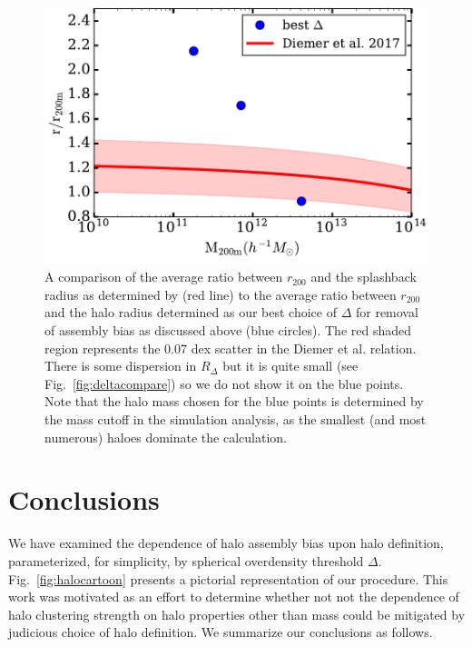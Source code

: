 \documentclass[usenatbib,fleqn]{mnras}
\begin{document}
\begin{figure}
	\centering
	\includegraphics[width=\columnwidth]{test_splashback.pdf}
	\caption{A comparison of the average ratio between $r_{200}$ and the splashback radius as determined by \citet{diemer_etal17} (red line) to the average ratio between $r_{200}$ and the halo radius determined as our best choice of $\Delta$ for removal of assembly bias as discussed above (blue circles). The red shaded region represents the 0.07 dex scatter in the Diemer et al. relation. There is some dispersion in $R_{\Delta}$ but it is quite small (see Fig.~\ref{fig:deltacompare}) so we do not show it on the blue points. Note that the halo mass chosen for the blue points is determined by the mass cutoff in the simulation analysis, as the smallest (and most numerous) haloes dominate the calculation.
}
	\label{fig:splashback_compare}
\end{figure}

\section[]{Conclusions}
\label{section:conclusions}

We have examined the dependence of halo assembly bias upon halo definition, parameterized, for simplicity, by spherical overdensity threshold $\Delta$. Fig.~\ref{fig:halocartoon} presents a pictorial representation of our procedure. This work was motivated as an effort to determine whether not not the dependence of halo clustering strength on halo properties other than mass could be mitigated by judicious choice of halo definition. We summarize our conclusions as follows.
\end{document}
